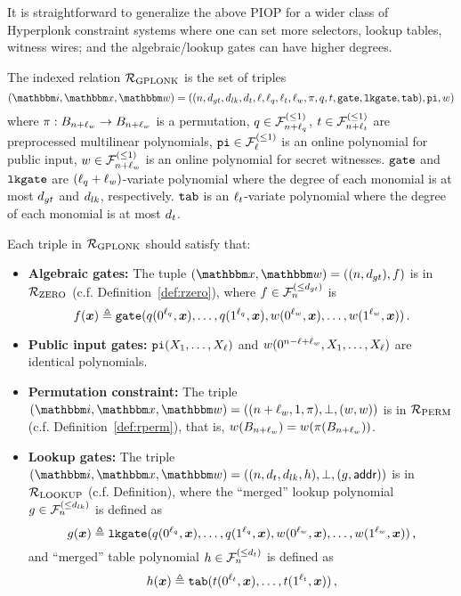 It is straightforward to generalize the above PIOP for a wider class of Hyperplonk constraint systems 
where one can set more selectors, lookup tables, witness wires; and the algebraic/lookup gates can have higher degrees.


\begin{definition}
    The indexed relation ${\mathcal{R}}_{\text{GPLONK}}$ is the set of triples 
    \[
        (\idxR, \instR, \witR) = 
            ((n, \dgate, \dlk, \dtab, 
              \ell, \lsel, \ltab, \lwit, 
              \perm, \sel, \tabp, 
              \gatep, \lgatep, \ltabp), 
            \pubinp, 
            \witp)
    \]
    where $\pi : B_{n+\ell_w} \rightarrow B_{n+\ell_w}$
    is a permutation, $q \in {\mathcal{F}}_{n+\ell_q}^{(\le{1})}$, $t \in {\mathcal{F}}_{n+\ell_t}^{(\le{1})}$ are preprocessed 
    multilinear polynomials, $\mathtt{pi} \in {\mathcal{F}}_{\ell}^{(\le{1})}$ is an 
    online polynomial for public input, $w \in {\mathcal{F}}_{n+\ell_w}^{(\le{1})}$
    is an online polynomial for secret witnesses. 
    $\mathtt{gate}$ and $\mathtt{lkgate}$ are $(\ell_q+\ell_w)$-variate polynomial where the degree of each monomial
    is at most $d_{gt}$ and $d_{lk}$, respectively.
    $\mathtt{tab}$ is an $\ell_t$-variate polynomial where the degree of each monomial is at most $d_t$.
    
    Each triple in ${\mathcal{R}}_{\text{GPLONK}}$ should satisfy that:
    \begin{itemize}
        \item \textbf{Algebraic gates:} The tuple $(\instR, \witR) = ((n,\dgate), f)$ is in ${\mathcal{R}}_{\text{ZERO}}$ (c.f. Definition~\ref{def:rzero}),
            where $f \in {\mathcal{F}}_{n}^{(\le{d_{gt}})}$ is
            \[
              f(\boldsymbol{x}) \mathrel{\triangleq} \mathtt{gate}(q(0^{\ell_q}, \boldsymbol{x}), \dots, q(1^{\ell_q}, \boldsymbol{x}), w(0^{\ell_w}, \boldsymbol{x}), \dots, w(1^{\ell_w}, \boldsymbol{x})) \,.
            \] 
        \item \textbf{Public input gates:} $\mathtt{pi}(X_1, \dots, X_{\ell})$ and $w(0^{n-\ell+\ell_w}, X_1, \dots, X_{\ell})$
            are identical polynomials.
        \item \textbf{Permutation constraint:} The triple $(\idxR, \instR, \witR)=((n+\lwit, 1, \perm), \bot, (\witp, \witp))$ 
            is in ${\mathcal{R}}_{\text{PERM}}$ (c.f. Definition~\ref{def:rperm}), that is, $w(B_{n+\ell_w}) = w(\pi(B_{n+\ell_w}))$.
        \item \textbf{Lookup gates:} The triple $(\idxR, \instR, \witR)=((n, \dtab, \dlk, h), \bot, (g, \addr))$
            is in ${\mathcal{R}}_{\text{LOOKUP}}$ (c.f. Definition), where the ``merged'' lookup polynomial $g \in {\mathcal{F}}_{n}^{(\le{d_{lk}})}$ is defined as 
            \[
              g(\boldsymbol{x}) \mathrel{\triangleq} \mathtt{lkgate}(q(0^{\ell_q}, \boldsymbol{x}), \dots, q(1^{\ell_q}, \boldsymbol{x}), w(0^{\ell_w}, \boldsymbol{x}), \dots, w(1^{\ell_w}, \boldsymbol{x})) \,,
            \]
            and ``merged'' table polynomial $h \in {\mathcal{F}}_{n}^{(\le{d_t})}$ is defined as 
            \[
              h(\boldsymbol{x}) \mathrel{\triangleq} \mathtt{tab}(t(0^{\ell_t}, \boldsymbol{x}), \dots, t(1^{\ell_t}, \boldsymbol{x})) \,,
            \]
    \end{itemize}
\end{definition}